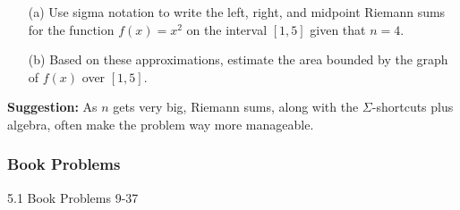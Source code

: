 \documentclass[cal1spr16Lectures.tex]{subfiles}
\begin{document}
\begin{frame}\small
\begin{exe} 
\begin{itemize}
\item[(a)] Use sigma notation to write the left, right, and midpoint Riemann sums for the function $f(x)=x^2$ on the interval $[1,5]$ given that $n=4$.
\item[(b)] Based on these approximations, estimate the area bounded by the graph of $f(x)$ over $[1,5]$.
\end{itemize}
\end{exe}
{\bf Suggestion:} As $n$ gets very big, Riemann sums, along with the $\Sigma$-shortcuts plus algebra, often make the problem way more manageable. 
\end{frame}

\subsubsection{Book Problems}

\begin{frame}
\begin{block}{5.1 Book Problems}
9-37
\end{block}
\end{frame}


\end{document}
